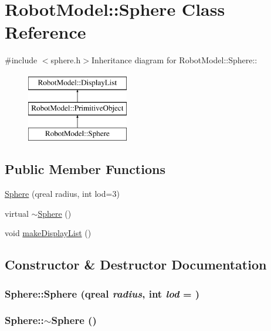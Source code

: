 \hypertarget{class_robot_model_1_1_sphere}{
\section{RobotModel::Sphere Class Reference}
\label{class_robot_model_1_1_sphere}
}


{\ttfamily \#include $<$sphere.h$>$}Inheritance diagram for RobotModel::Sphere::\begin{figure}[H]
\begin{center}
\leavevmode
\includegraphics[height=3cm]{class_robot_model_1_1_sphere}
\end{center}
\end{figure}
\subsection*{Public Member Functions}
\begin{DoxyCompactItemize}
\item 
\hyperlink{class_robot_model_1_1_sphere_a9944239ac9fc56091f17701f547652da}{Sphere} (qreal radius, int lod=3)
\item 
virtual \hyperlink{class_robot_model_1_1_sphere_a569c071e50a3e11f678630ee1a17737e}{$\sim$Sphere} ()
\item 
void \hyperlink{class_robot_model_1_1_sphere_a838b5ae4f743aabe24a255dd61d2843c}{makeDisplayList} ()
\end{DoxyCompactItemize}


\subsection{Constructor \& Destructor Documentation}
\hypertarget{class_robot_model_1_1_sphere_a9944239ac9fc56091f17701f547652da}{
\subsubsection[{Sphere}]{\setlength{\rightskip}{0pt plus 5cm}Sphere::Sphere (qreal {\em radius}, \/  int {\em lod} = {})}}
\label{class_robot_model_1_1_sphere_a9944239ac9fc56091f17701f547652da}
\hypertarget{class_robot_model_1_1_sphere_a569c071e50a3e11f678630ee1a17737e}{
\subsubsection[{$\sim$Sphere}]{\setlength{\rightskip}{0pt plus 5cm}Sphere::$\sim$Sphere ()}}
\label{class_robot_model_1_1_sphere_a569c071e50a3e11f678630ee1a17737e}


